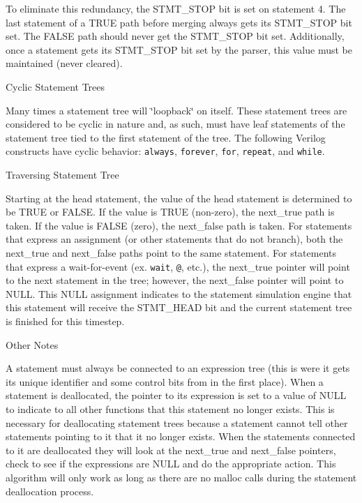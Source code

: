  To eliminate this redundancy, the STMT\_\-STOP bit is set on statement 4. The last statement of a TRUE path before merging always gets its STMT\_\-STOP bit set. The FALSE path should never get the STMT\_\-STOP bit set. Additionally, once a statement gets its STMT\_\-STOP bit set by the parser, this value must be maintained (never cleared).\begin{Desc}
\item[Cyclic Statement Trees]\par
 Many times a statement tree will \char`\"{}loopback\char`\"{} on itself. These statement trees are considered to be cyclic in nature and, as such, must have leaf statements of the statement tree tied to the first statement of the tree. The following Verilog constructs have cyclic behavior: {\tt always}, {\tt forever}, {\tt for}, {\tt repeat}, and {\tt while}.\end{Desc}
\begin{Desc}
\item[Traversing Statement Tree]\par
 Starting at the head statement, the value of the head statement is determined to be TRUE or FALSE. If the value is TRUE (non-zero), the next\_\-true path is taken. If the value is FALSE (zero), the next\_\-false path is taken. For statements that express an assignment (or other statements that do not branch), both the next\_\-true and next\_\-false paths point to the same statement. For statements that express a wait-for-event (ex. {\tt wait}, {\tt @}, etc.), the next\_\-true pointer will point to the next statement in the tree; however, the next\_\-false pointer will point to NULL. This NULL assignment indicates to the statement simulation engine that this statement will receive the STMT\_\-HEAD bit and the current statement tree is finished for this timestep.\end{Desc}
\begin{Desc}
\item[Other Notes]\par
 A statement must always be connected to an expression tree (this is were it gets its unique identifier and some control bits from in the first place). When a statement is deallocated, the pointer to its expression is set to a value of NULL to indicate to all other functions that this statement no longer exists. This is necessary for deallocating statement trees because a statement cannot tell other statements pointing to it that it no longer exists. When the statements connected to it are deallocated they will look at the next\_\-true and next\_\-false pointers, check to see if the expressions are NULL and do the appropriate action. This algorithm will only work as long as there are no malloc calls during the statement deallocation process.\end{Desc}


